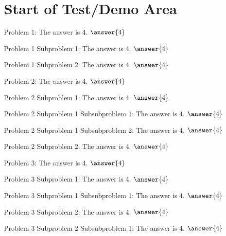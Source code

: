 \documentclass{ximera}
\begin{document}
\section{Start of Test/Demo Area}


\begin{problem}
    Problem 1: The answer is 4. $\answer{4}$
    \begin{problem}
        Problem 1 Subproblem 1: The answer is 4. $\answer{4}$
    \end{problem} 
    \begin{problem}
        Problem 1 Subproblem 2: The answer is 4. $\answer{4}$
    \end{problem} 
\end{problem} 

\begin{problem}
    Problem 2: The answer is 4. $\answer{4}$
    \begin{problem}
        Problem 2 Subproblem 1: The answer is 4. $\answer{4}$
        \begin{problem}
            Problem 2 Subproblem 1 Subsubproblem 1: The answer is 4. $\answer{4}$
        \end{problem} 
        \begin{problem}
            Problem 2 Subproblem 1 Subsubproblem 2: The answer is 4. $\answer{4}$
        \end{problem} 
    \end{problem} 
    \begin{problem}
        Problem 2 Subproblem 2: The answer is 4. $\answer{4}$
    \end{problem} 
\end{problem} 

\begin{problem}
    Problem 3: The answer is 4. $\answer{4}$
    \begin{problem}
        Problem 3 Subproblem 1: The answer is 4. $\answer{4}$
        \begin{problem}
            Problem 3 Subproblem 1 Subsubproblem 1: The answer is 4. $\answer{4}$
        \end{problem} 
    \end{problem}
    \begin{problem}
        Problem 3 Subproblem 2: The answer is 4. $\answer{4}$
        \begin{problem}
            Problem 3 Subproblem 2 Subsubproblem 1: The answer is 4. $\answer{4}$
        \end{problem} 
    \end{problem} 
\end{problem} 
\end{document}
